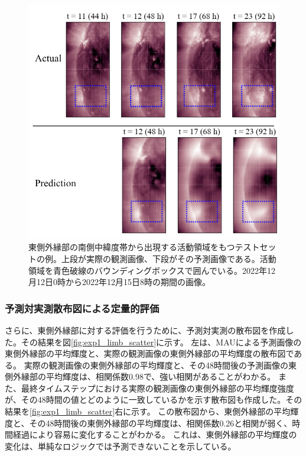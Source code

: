         \begin{figure}[htbp]
          \centering
          \includegraphics[width=\textwidth]{figures/exp1/limb_sample_12_caption.jpg}
          \caption{東側外縁部の南側中緯度帯から出現する活動領域をもつテストセットの例。上段が実際の観測画像、下段がその予測画像である。活動領域を青色破線のバウンディングボックスで囲んでいる。2022年12月12日0時から2022年12月15日8時の期間の画像。}
          \label{fig:exp1_limb_example_2}
        \end{figure}

      \subsubsection{予測対実測散布図による定量的評価}
        さらに、東側外縁部に対する評価を行うために、予測対実測の散布図を作成した。その結果を図\ref{fig:exp1_limb_scatter}に示す。
        左は、MAUによる予測画像の東側外縁部の平均輝度と、実際の観測画像の東側外縁部の平均輝度の散布図である。
        実際の観測画像の東側外縁部の平均輝度と、その48時間後の予測画像の東側外縁部の平均輝度は、相関係数0.98で、強い相関があることがわかる。
        また、最終タイムステップにおける実際の観測画像の東側外縁部の平均輝度強度が、その48時間の値とどのように一致しているかを示す散布図も作成した。その結果を\ref{fig:exp1_limb_scatter}右に示す。
        この散布図から、東側外縁部の平均輝度と、その48時間後の東側外縁部の平均輝度は、相関係数0.26と相関が弱く、時間経過により容易に変化することがわかる。
        これは、東側外縁部の平均輝度の変化は、単純なロジックでは予測できないことを示している。
        
